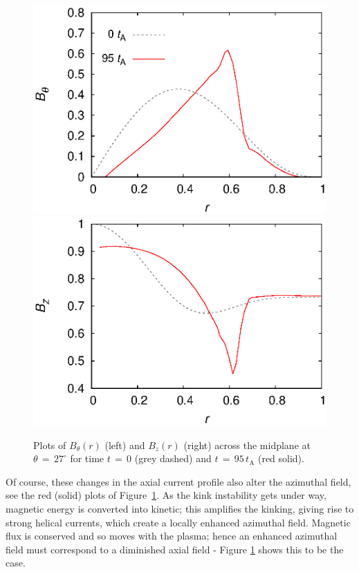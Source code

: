 \documentclass{./packages/rs/rsproca}
\begin{document}
\begin{figure}[h!]
  \center  
  \vspace{-10pt}
  \includegraphics[scale=0.51]{./gnuplot/256x256x512/btheta_r_95}
  \hspace{5pt}
  \includegraphics[scale=0.51]{./gnuplot/256x256x512/bz_r_95}
  \caption{\small{Plots of $B_{\theta}(r)$ (left) and $B_{z}(r)$ (right) across the midplane at $\theta\,{=}\,27^{\circ}$ for time $t\,{=}\,0$ (grey dashed) and $t\,{=}\,95\,t_{\mathrm{A}}$ (red solid).}}
  \label{b_rad}
  \vspace{-20pt}
\end{figure}
Of course, these changes in the axial current profile also alter the azimuthal field, see the red (solid) plots of \mbox{Figure \ref{b_rad}}. As the kink instability gets under way, magnetic energy is converted into kinetic; this amplifies the kinking, giving rise to strong helical currents, which create a locally enhanced azimuthal field. Magnetic flux is conserved and so moves with the plasma; hence an enhanced azimuthal field must correspond to a diminished axial field - Figure \ref{b_rad} shows this to be the case.
\end{document}
